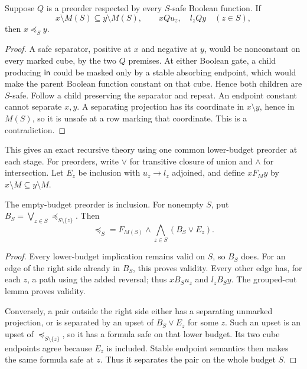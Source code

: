 \begin{lemma}
\label{core:lem:grouped-cut}
Suppose $Q$ is a preorder respected by every $S$-safe Boolean function.
If
\[
 x\setminus M(S)\subseteq y\setminus M(S),\qquad
 xQ u_z,\quad l_zQ y\quad(z\in S),
\]
then $x\preceq_S y$.
\end{lemma}
\begin{proof}
A safe separator, positive at $x$ and negative at $y$, would be
nonconstant on every marked cube, by the two $Q$ premises.
At either Boolean gate, a child producing $\mathsf{in}$ could be
masked only by a stable absorbing endpoint, which would make the
parent Boolean function constant on that cube. Hence both children
are $S$-safe. Follow a child preserving the separator and repeat.
An endpoint constant cannot separate $x,y$. A separating projection
has its coordinate in $x\setminus y$, hence in $M(S)$, so it is
unsafe at a row marking that coordinate. This is a contradiction.
\end{proof}

This gives an exact recursive theory using one common lower-budget
preorder at each stage. For preorders, write $\vee$ for transitive
closure of union and $\wedge$ for intersection. Let $E_z$ be inclusion
with $u_z\to l_z$ adjoined, and define
$xF_My$ by $x\setminus M\subseteq y\setminus M$.

\begin{proposition}
\label{core:prop:grouped-safety-preorder}
The empty-budget preorder is inclusion. For nonempty $S$, put
$B_S=\bigvee_{z\in S}\preceq_{S\setminus\{z\}}$. Then
\[
 \preceq_S=
 F_{M(S)}\wedge\bigwedge_{z\in S}(B_S\vee E_z).
\]
\end{proposition}
\begin{proof}
Every lower-budget implication remains valid on $S$, so $B_S$ does.
For an edge of the right side already in $B_S$, this proves validity.
Every other edge has, for each $z$, a path using the added reversal;
thus $xB_Su_z$ and $l_zB_Sy$. The grouped-cut lemma proves validity.

Conversely, a pair outside the right side either has a separating
unmarked projection, or is separated by an upset of $B_S\vee E_z$
for some $z$. Such an upset is an upset of
$\preceq_{S\setminus\{z\}}$, so it has a formula safe on that
lower budget. Its two cube endpoints agree because $E_z$ is included.
Stable endpoint semantics then makes the same formula safe at $z$.
Thus it separates the pair on the whole budget $S$.
\end{proof}

